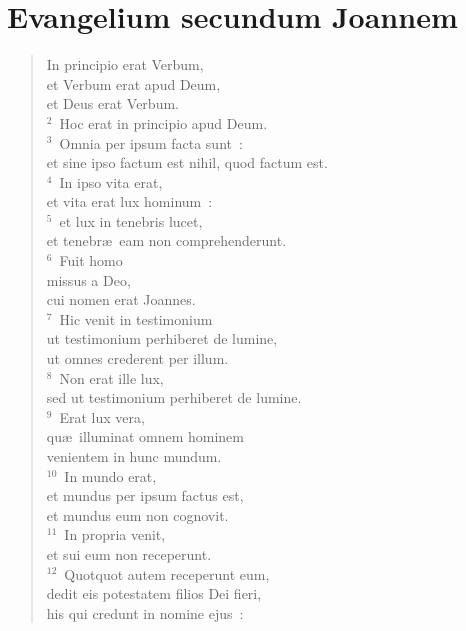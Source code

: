 \clearpage
{\centering \section*{Evangelium secundum Joannem}}\thispagestyle{empty}

\begin{flushleft}\begin{verse}\vspace{-11pt}In principio erat Verbum,\\ et Verbum erat apud Deum,\\ et Deus erat Verbum.\\
${}^{2}$~Hoc erat in principio apud Deum.\\
${}^{3}$~Omnia per ipsum facta sunt~:\\ et sine ipso factum est nihil, quod factum est.\\
${}^{4}$~In ipso vita erat,\\ et vita erat lux hominum~:\\
${}^{5}$~et lux in tenebris lucet,\\ et tenebr\ae\ eam non comprehenderunt.\\
${}^{6}$~Fuit homo\\ missus a Deo,\\ cui nomen erat Joannes.\\
${}^{7}$~Hic venit in testimonium\\ ut testimonium perhiberet de lumine,\\ ut omnes crederent per illum.\\
${}^{8}$~Non erat ille lux,\\ sed ut testimonium perhiberet de lumine.\\
${}^{9}$~Erat lux vera,\\ qu\ae\ illuminat omnem hominem\\ venientem in hunc mundum.\\
${}^{10}$~In mundo erat,\\ et mundus per ipsum factus est,\\ et mundus eum non cognovit.\\
${}^{11}$~In propria venit,\\ et sui eum non receperunt.\\
${}^{12}$~Quotquot autem receperunt eum,\\ dedit eis potestatem filios Dei fieri,\\ his qui credunt in nomine ejus~:\\

\end{verse}
\end{flushleft}
